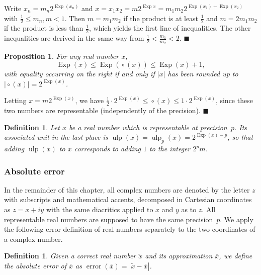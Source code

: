 \documentclass {article}
\newcommand {\corr}[1]{\widetilde {#1}}
\newcommand {\appro}[1]{\overline {#1}}
\newcommand {\Ulp}{{\operatorname {ulp}}}
\DeclareMathOperator{\Exp}{\operatorname {Exp}}
\newcommand{\error}{\operatorname {error}}
\newcommand {\round}{\operatorname {\circ}}
\renewcommand {\leq}{\leqslant}
\newtheorem{definition}[theorem]{Definition}
\newtheorem{prop}[theorem]{Proposition}
\newenvironment{proof}{\noindent{\bf Proof:}}{{\hspace* {\fill}$\blacksquare$}}
\begin{document}
\begin {proof}
Write $x_n = m_n 2^{\Exp (x_n)}$ and
$x = x_1 x_2 = m 2^{\Exp x} = m_1 m_2 2^{\Exp (x_1) + \Exp (x_2)}$
with $\frac {1}{2} \leq m_n, m < 1$.
Then $m = m_1 m_2$ if the product is at least $\frac {1}{2}$ and
$m = 2 m_1 m_2$ if the product is less than $\frac {1}{2}$, which
yields the first line of inequalities.
The other inequalities are derived in the same way from
$\frac {1}{2} < \frac {m_1}{m_2} < 2$.
\end {proof}


\begin {prop}
\label {prop:expround}
For any real number $x$,
\[
\Exp (x) \leq \Exp (\round (x)) \leq \Exp (x) + 1,
\]
with equality occurring on the right if and only if
$|x|$ has been rounded up to $|\round (x)| = 2^{\Exp (x)}$.
\end {prop}

\begin {proof}
Letting $x = m 2^{\Exp (x)}$, we have
$\frac {1}{2} \cdot 2^{\Exp (x)} \leq \round (x) \leq 1 \cdot 2^{\Exp (x)}$,
since these two numbers are representable (independently of the precision).
\end {proof}


\begin {definition}
\label {def:ulp}
Let $x$ be a real number which is representable at precision~$p$.
Its associated {\em unit in the last place} is
$\Ulp(x) = \Ulp_p (x) = 2^{\Exp(x) - p}$, so that adding $\Ulp(x)$ to $x$
corresponds to adding $1$ to the integer $2^p m$.
\end {definition}


\subsubsection {Absolute error}

In the remainder of this chapter, all complex numbers are denoted by
the letter $z$ with subscripts and mathematical accents, decomposed in
Cartesian coordinates as $z = x + i y$ with the same diacritics applied
to $x$ and $y$ as to $z$. All representable real numbers are supposed
to have the same precision~$p$. We apply the following error definition
of real numbers separately to the two coordinates of a complex number.

\begin {definition}
\label {def:error}
Given a correct real number $\corr x$ and its approximation $\appro x$,
we define the {\em absolute error} of $\appro x$ as
$\error (\appro x) = | \corr x - \appro x |$.
\end {definition}
\end{document}
